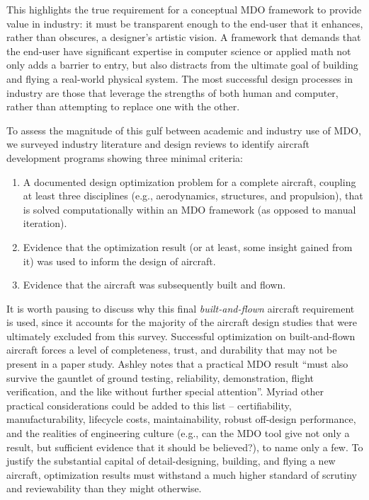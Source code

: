 This highlights the true requirement for a conceptual MDO framework to provide value in industry: it must be transparent enough to the end-user that it enhances, rather than obscures, a designer's artistic vision. A framework that demands that the end-user have significant expertise in computer science or applied math not only adds a barrier to entry, but also distracts from the ultimate goal of building and flying a real-world physical system. The most successful design processes in industry are those that leverage the strengths of both human and computer, rather than attempting to replace one with the other.

To assess the magnitude of this gulf between academic and industry use of MDO, we surveyed industry literature and design reviews to identify aircraft development programs showing three minimal criteria:
\begin{enumerate}[noitemsep]
    \item A documented design optimization problem for a complete aircraft, coupling at least three disciplines (e.g., aerodynamics, structures, and propulsion), that is solved computationally within an MDO framework (as opposed to manual iteration).
    \item Evidence that the optimization result (or at least, some insight gained from it) was used to inform the design of aircraft.
    \item Evidence that the aircraft was subsequently built and flown.
\end{enumerate}

\noindent It is worth pausing to discuss why this final \textit{built-and-flown} aircraft requirement is used, since it accounts for the majority of the aircraft design studies that were ultimately excluded from this survey. Successful optimization on built-and-flown aircraft forces a level of completeness, trust, and durability that may not be present in a paper study. Ashley notes that a practical MDO result ``must also survive the gauntlet of ground testing, reliability, demonstration, flight verification, and the like without further special attention''. \cite{ashley_making_1982} Myriad other practical considerations could be added to this list -- certifiability, manufacturability, lifecycle costs, maintainability, robust off-design performance, and the realities of engineering culture (e.g., can the MDO tool give not only a result, but sufficient evidence that it should be believed?), to name only a few. To justify the substantial capital of detail-designing, building, and flying a new aircraft, optimization results must withstand a much higher standard of scrutiny and reviewability than they might otherwise.

